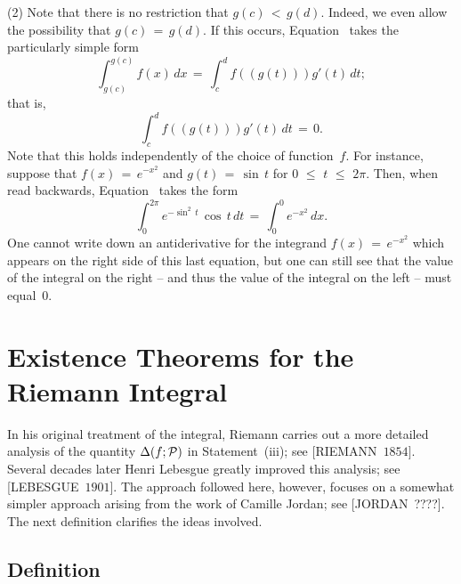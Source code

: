         (2) Note that there is no restriction that $g(c)\,<\,g(d)$. Indeed, we even allow the possibility that $g(c) \,=\, g(d)$.
    If this occurs, Equation~ takes the particularly simple form
        \begin{displaymath}
        \int_{g(c)}^{g(c)} f(x)\,dx \,=\, \int_{c}^{d} f((g(t)))g'(t)\,dt; 
        \end{displaymath}
    that is,
        \begin{displaymath}
        \int_{c}^{d} f((g(t)))g'(t)\,dt \,=\, 0.
        \end{displaymath}
    Note that this holds independently of the choice of function~$f$.
    For instance, suppose that $f(x) \,=\, e^{-x^{2}}$ and $g(t) \,=\, {\sin}\,t$ for $0\,\,{\leq}\,\,t\,\,{\leq}\,\,2{\pi}$.
    Then, when read backwards, Equation~ takes the form
        \begin{displaymath}
        \int_{0}^{2{\pi}} e^{-{\sin}^{2}\,t}\,{\cos}\,t\,dt \,=\, \int_{0}^{0} e^{-x^{2}}\,dx.
        \end{displaymath}
    One cannot write down an antiderivative for the integrand $f(x) \,=\, e^{-x^{2}}$ which appears on the right side of this last equation,
    but one can still see that the value of the integral on the right -- and thus the value of the integral on the left -- must equal~$0$.

\V
\V


\VV


        \section{{\bf Existence Theorems for the Riemann Integral}}
        \label{SectH27}

\V


        In his original treatment of the integral, Riemann carries out a more detailed analysis of the quantity ${\Delta}(f;{\cal P})$ in Statement~(iii); see [RIEMANN~$1854]$.
    Several decades later Henri Lebesgue greatly improved this analysis; see [LEBESGUE~$1901$]. The approach followed here,
    however, focuses on a somewhat simpler approach arising from the work of Camille Jordan; see [JORDAN~????]. The next definition clarifies the ideas involved.

\V

        \subsection{\small{{\bf Definition}}}
        \label{DefH20.45A}

